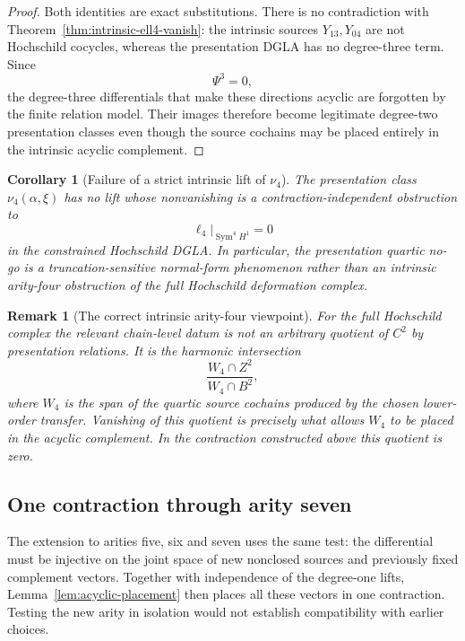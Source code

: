 \documentclass[11pt]{amsart}
\newtheorem{corollary}[theorem]{Corollary}
\newtheorem{remark}[theorem]{Remark}
\begin{document}
\begin{proof}
Both identities are exact substitutions.  There is no contradiction with Theorem~\ref{thm:intrinsic-ell4-vanish}: the intrinsic sources $Y_{13},Y_{04}$ are not Hochschild cocycles, whereas the presentation DGLA has no degree-three term.  Since
\[
\Psi^3=0,
\]
the degree-three differentials that make these directions acyclic are forgotten by the finite relation model.  Their images therefore become legitimate degree-two presentation classes even though the source cochains may be placed entirely in the intrinsic acyclic complement.
\end{proof}

\begin{corollary}[Failure of a strict intrinsic lift of $\nu_4$]\label{cor:no-intrinsic-nu4-lift}
The presentation class $\nu_4(\alpha,\xi)$ has no lift whose nonvanishing is a contraction-independent obstruction to
\[
\ell_4|_{\operatorname{Sym}^4H^1}=0
\]
in the constrained Hochschild DGLA.  In particular, the presentation quartic no-go is a truncation-sensitive normal-form phenomenon rather than an intrinsic arity-four obstruction of the full Hochschild deformation complex.
\end{corollary}

\begin{remark}[The correct intrinsic arity-four viewpoint]
For the full Hochschild complex the relevant chain-level datum is not an arbitrary quotient of $C^2$ by presentation relations.  It is the harmonic intersection
\[
\frac{W_4\cap Z^2}{W_4\cap B^2},
\]
where $W_4$ is the span of the quartic source cochains produced by the chosen lower-order transfer.  Vanishing of this quotient is precisely what allows $W_4$ to be placed in the acyclic complement.  In the contraction constructed above this quotient is zero.
\end{remark}


\subsection{One contraction through arity seven}
The extension to arities five, six and seven uses the same test:
the differential must be injective on the joint space of new nonclosed
sources and previously fixed complement vectors. Together with independence
of the degree-one lifts, Lemma~\ref{lem:acyclic-placement} then places all
these vectors in one contraction. Testing the new arity in isolation would
not establish compatibility with earlier choices.
\end{document}
